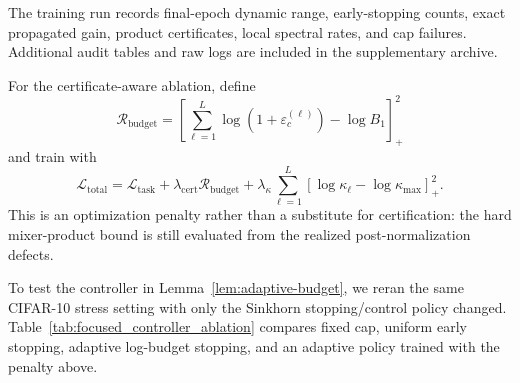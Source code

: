 \documentclass[10pt]{article}
\numberwithin{equation}{section}
\theoremstyle{plain}
\theoremstyle{definition}
\theoremstyle{remark}
\begin{document}
The training run records final-epoch dynamic range, early-stopping counts, exact propagated
gain, product certificates, local spectral rates, and cap failures. Additional audit tables
and raw logs are included in the supplementary archive.

For the certificate-aware ablation, define
\[
\mathcal R_{\mathrm{budget}}
=
\left[\sum_{\ell=1}^L\log(1+\varepsilon_c^{(\ell)})-\log B_1\right]_+^2
\]
and train with
\[
\mathcal L_{\mathrm{total}}
=
\mathcal L_{\mathrm{task}}
+\lambda_{\mathrm{cert}}\mathcal R_{\mathrm{budget}}
+\lambda_\kappa\sum_{\ell=1}^L
\left[\log\kappa_\ell-\log\kappa_{\max}\right]_+^2.
\]
This is an optimization penalty rather than a substitute for certification: the hard
mixer-product bound is still evaluated from the realized post-normalization defects.

To test the controller in Lemma~\ref{lem:adaptive-budget}, we reran the same CIFAR-10
stress setting with only the Sinkhorn stopping/control policy changed.
Table~\ref{tab:focused_controller_ablation} compares fixed cap, uniform early stopping,
adaptive log-budget stopping, and an adaptive policy trained with the penalty above.
\end{document}
